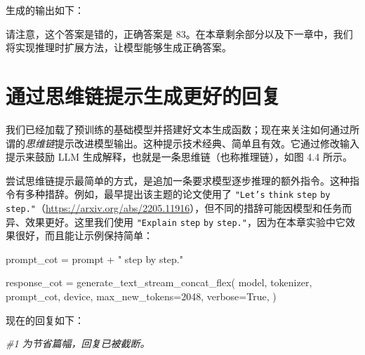 生成的输出如下：

\begin{codebox}
\end{codebox}

请注意，这个答案是错的，正确答案是 83。在本章剩余部分以及下一章中，我们将实现推理时扩展方法，让模型能够生成正确答案。

\section{通过思维链提示生成更好的回复}

我们已经加载了预训练的基础模型并搭建好文本生成函数；现在来关注如何通过所谓的\emph{思维链}提示改进模型输出。这种提示技术经典、简单且有效。它通过修改输入提示来鼓励 LLM 生成解释，也就是一条思维链（也称推理链），如图 4.4 所示。


尝试思维链提示最简单的方式，是追加一条要求模型逐步推理的额外指令。这种指令有多种措辞。例如，最早提出该主题的论文使用了 \texttt{"}\texttt{Let}\texttt{'}\texttt{s} \texttt{think} \texttt{step} \texttt{by} \texttt{step.}\texttt{"}（\href{https://arxiv.org/abs/2205.11916}{https://arxiv.org/abs/2205.11916}），但不同的措辞可能因模型和任务而异、效果更好。这里我们使用 \texttt{"}\texttt{Explain} \texttt{step} \texttt{by} \texttt{step.}\texttt{"}，因为在本章实验中它效果很好，而且能让示例保持简单：

\begin{codebox}
prompt_cot = prompt + " \n\nExplain step by step."

response_cot = generate_text_stream_concat_flex(
    model, tokenizer, prompt_cot, device,
    max_new_tokens=2048, verbose=True,
)
\end{codebox}

现在的回复如下：

{\noindent\small\textit{\#1 为节省篇幅，回复已被截断。}\par}

